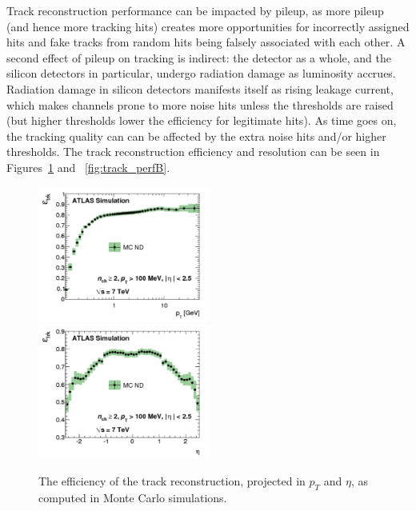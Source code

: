 Track reconstruction performance can be impacted by pileup, as more pileup (and hence more tracking hits) creates 
more opportunities for incorrectly assigned hits and fake tracks from random hits being falsely associated with each other.  A 
second effect of pileup on tracking is indirect: the detector as a whole, and the silicon detectors in 
particular, undergo radiation damage as luminosity accrues.  Radiation damage in silicon detectors manifests 
itself as rising leakage current, which makes channels prone to more noise hits unless the thresholds are raised 
(but higher thresholds lower the efficiency for legitimate hits).  As time goes on, the tracking quality can can 
be affected by the extra noise hits and/or higher thresholds.  The track reconstruction efficiency and resolution
can be seen in Figures~\ref{fig:track_perfA} and ~\ref{fig:track_perfB}.

\begin{figure}
	\includegraphics[width=0.5\textwidth]{ReconstructionPerformance/images/track_perf1.pdf}
	\includegraphics[width=0.5\textwidth]{ReconstructionPerformance/images/track_perf2.pdf}
	\caption{The efficiency of the track reconstruction, projected in $p_T$ and $\eta$, as computed in Monte Carlo simulations.\label{fig:track_perfA}}
\end{figure}



